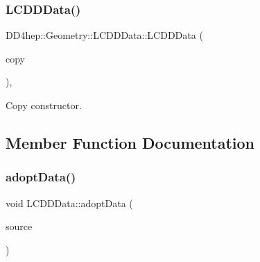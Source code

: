\hypertarget{class_d_d4hep_1_1_geometry_1_1_l_c_d_d_data_ad4bb0b37126711f802a94b6772703031}{}\label{class_d_d4hep_1_1_geometry_1_1_l_c_d_d_data_ad4bb0b37126711f802a94b6772703031} 
\subsubsection{\texorpdfstring{L\+C\+D\+D\+Data()}{LCDDData()}\hspace{0.1cm}{\footnotesize\ttfamily [2/2]}}
{\footnotesize\ttfamily D\+D4hep\+::\+Geometry\+::\+L\+C\+D\+D\+Data\+::\+L\+C\+D\+D\+Data (\begin{DoxyParamCaption}\item[{const \hyperlink{class_d_d4hep_1_1_geometry_1_1_l_c_d_d_data}{L\+C\+D\+D\+Data} \&}]{copy }\end{DoxyParamCaption})\hspace{0.3cm}{\ttfamily [protected]}, {\ttfamily [delete]}}



Copy constructor. 



\subsection{Member Function Documentation}
\hypertarget{class_d_d4hep_1_1_geometry_1_1_l_c_d_d_data_a2f2797cec01fb1e6e6c6e762c9ffc170}{}\label{class_d_d4hep_1_1_geometry_1_1_l_c_d_d_data_a2f2797cec01fb1e6e6c6e762c9ffc170} 
\subsubsection{\texorpdfstring{adopt\+Data()}{adoptData()}}
{\footnotesize\ttfamily void L\+C\+D\+D\+Data\+::adopt\+Data (\begin{DoxyParamCaption}\item[{\hyperlink{class_d_d4hep_1_1_geometry_1_1_l_c_d_d_data}{L\+C\+D\+D\+Data} \&}]{source }\end{DoxyParamCaption})}



